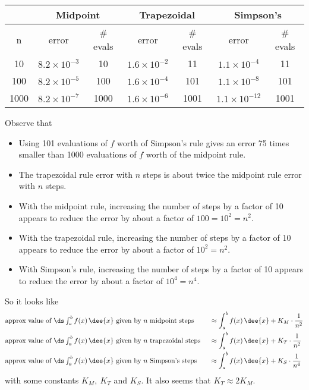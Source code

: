 \renewcommand{\arraystretch}{1.1}
\begin{center}
     \begin{tabular}{|c|c|c|c|c|c|c|}
          \hline
          & \multicolumn{2}{|c|}{\textbf{Midpoint}}&
            \multicolumn{2}{|c|}{\textbf{Trapezoidal}}&
            \multicolumn{2}{|c|}{\textbf{Simpson's}}\\          \hline
          n & error & \#  evals & error & \#  evals
                & error & \# evals \\
          \hline
          10 & $8.2\times 10^{-3}$ & 10 & $1.6\times 10^{-2}$ & 11 &
                  $1.1\times 10^{-4}$ & 11 \\
          100 & $8.2\times 10^{-5}$ & 100 & $1.6\times 10^{-4}$ & 101 &
                  $1.1\times 10^{-8}$ & 101 \\
          1000 & $8.2\times 10^{-7}$ & 1000 & $1.6\times 10^{-6}$ & 1001 &
                  $1.1\times 10^{-12}$ & 1001 \\
          \hline
     \end{tabular}
\end{center}
\renewcommand{\arraystretch}{1.0}


\noindent Observe that
\begin{itemize}
\item
   Using 101 evaluations of $f$ worth of Simpson's rule gives
   an error 75 times smaller than 1000 evaluations of $f$ worth
   of the midpoint rule.
\item
   The trapezoidal rule error with $n$ steps is about twice
   the midpoint rule  error with $n$ steps.
\item
    With the midpoint rule, increasing the number of steps
   by a factor of 10 appears to reduce the error by about a factor of
   $100=10^2=n^2$.
\item
  With the trapezoidal rule, increasing the number of steps
 by a factor of 10 appears to reduce the error by about a factor of $10^2=n^2$.
\item
   With Simpson's rule, increasing the number of steps
 by a factor of 10 appears to reduce the error by about a factor of $10^4=n^4$.
\end{itemize}

\noindent So it looks like
\begin{alignat*}{3}
&\hbox{approx value of $\ds\int_a^b f(x)\,\dee{x}$ given by $n$ midpoint steps  }
&&\approx \int_a^b f(x)\,\dee{x}+K_M\cdot \frac{1}{n^2}\\
%
&\hbox{approx value of $\ds\int_a^b f(x)\,\dee{x}$ given by $n$ trapezoidal steps  }
&&\approx  \int_a^b f(x)\,\dee{x}+K_T\cdot \frac{1}{n^2}\\
%
&\hbox{approx value of $\ds\int_a^b f(x)\,\dee{x}$ given by $n$ Simpson's steps  }
&&\approx  \int_a^b f(x)\,\dee{x}+K_S\cdot \frac{1}{n^4}
\end{alignat*}
with some constants $K_M,\ K_T$ and $K_S$. It also seems that $K_T\approx
2 K_M$.

